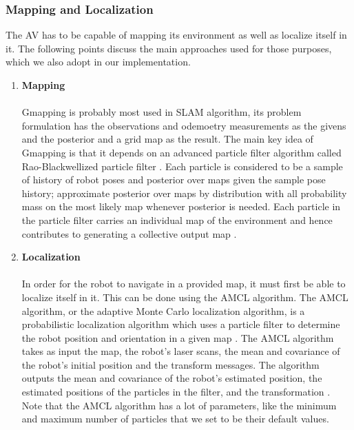 \subsubsection{Mapping and Localization}
\label{specs_loc_map}
The AV has to be capable of mapping its environment as well as localize itself in it. The following points discuss the main approaches used for those purposes, which we also adopt in our implementation.
\begin{enumerate}
\item \textbf{Mapping} 
\\ \\
Gmapping is probably most used in SLAM algorithm, its problem formulation has the observations and odemoetry measurements as the givens and the posterior and a grid map as the result. The main key idea of Gmapping is that it depends on an advanced particle filter algorithm called Rao-Blackwellized particle filter \cite{4084563}\cite{OpenSlam}. Each particle is considered to be a sample of history of robot poses and posterior over maps given the sample pose history; approximate posterior over maps by distribution with all probability mass on the most likely map whenever posterior is needed. Each particle in the particle filter carries an individual map of the environment and hence contributes to generating a collective output map \cite{thrun2005probabilistic}. 

\item \textbf{Localization} 
\\ \\
In order for the robot to navigate in a  provided map, it must first be able to localize itself in it. This can be done using the AMCL algorithm. The AMCL algorithm, or the adaptive Monte Carlo localization algorithm, is a probabilistic localization algorithm which uses a particle filter to determine the robot position and orientation in a given map \cite{10.5555/2566804}. 
The AMCL algorithm takes as input the map, the robot’s laser scans, the mean and covariance of the robot's initial position and the transform messages. The algorithm outputs the mean and covariance of the robot’s estimated position, the estimated positions of the particles in the filter, and the transformation \cite{10.5555/2566804}\cite{ROSRoboticsProjects}. Note that the AMCL algorithm has a lot of parameters, like the minimum and maximum number of particles that we set to be their default values.

\end{enumerate}

